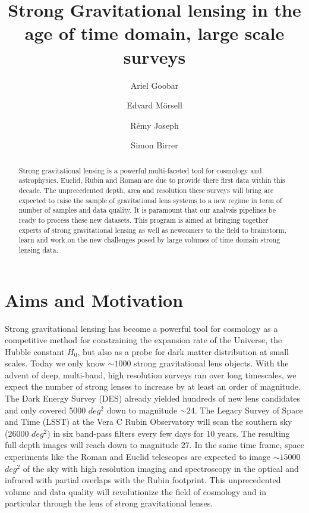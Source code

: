 \documentclass[11pt, letterpaper]{article}
\author[1]{Ariel Goobar}
\author[1]{Edvard M{\"o}rsell}
\author[1]{R\'emy Joseph}
\author[2]{Simon Birrer}
\affil[1]{The Oskar Klein Centre, Department of Physics, Stockholm University, AlbaNova, SE-10691 Stockholm, Sweden}
\affil[2]{Kavli Institute for Particle Astrophysics and Cosmology and Department of Physics, Stanford University, Stanford, CA 94305, USA}
\begin{document}
\title{Strong Gravitational lensing in the age of time domain, large scale surveys}
\maketitle

\begin{abstract}
    Strong gravitational lensing is a powerful multi-faceted tool for cosmology and astrophysics. Euclid, Rubin and Roman are due to provide there first data within this decade. The unprecedented depth, area and resolution these surveys will bring are expected to raise the sample of gravitational lens systems to a new regime in term of number of samples and data quality. It is paramount that our analysis pipelines  be ready to process these new datasets.
    This program is aimed at bringing together experts of strong gravitational lensing as well as newcomers to the field to brainstorm, learn and work on the new challenges posed by large volumes of time domain strong lensing data.
    
    
\end{abstract}


\section{Aims and Motivation}
    Strong gravitational lensing has become a powerful tool for cosmology as a competitive method for constraining the expansion rate of the Universe, the Hubble constant $H_0$, but also as a probe for dark matter distribution at small scales. Today we only know $\sim 1000$ strong gravitational lens objects. With the advent of deep, multi-band, high resolution surveys ran over long timescales, we expect the number of strong lenses to increase by at least an order of magnitude. The Dark Energy Survey (DES) already yielded hundreds of new lens candidates and only covered 5000 $deg^2$ down to magnitude $\sim 24$. The Legacy Survey of Space and Time (LSST) at the Vera C Rubin Observatory will scan the southern sky (26000 $deg^2$) in six band-pass filters every few days for 10 years. The resulting full depth images will reach down to magnitude $27$. In the same time frame, space experiments like the Roman and Euclid telescopes are expected to image $\sim 15000$ $deg^2$ of the sky with high resolution imaging and spectroscopy in the optical and infrared with partial overlaps with the Rubin footprint. This unprecedented volume and data quality will revolutionize the field of cosmology and in particular through the lens of strong gravitational lenses. 
    
\end{document}
